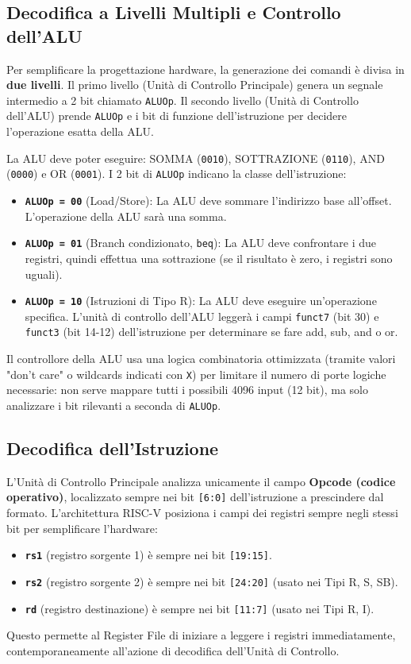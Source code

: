\documentclass[12pt, a4paper]{article}
\begin{document}
\subsection{Decodifica a Livelli Multipli e Controllo dell'ALU}
Per semplificare la progettazione hardware, la generazione dei comandi è divisa in \textbf{due livelli}. Il primo livello (Unità di Controllo Principale) genera un segnale intermedio a 2 bit chiamato \texttt{ALUOp}. Il secondo livello (Unità di Controllo dell'ALU) prende \texttt{ALUOp} e i bit di funzione dell'istruzione per decidere l'operazione esatta della ALU.

La ALU deve poter eseguire: SOMMA (\texttt{0010}), SOTTRAZIONE (\texttt{0110}), AND (\texttt{0000}) e OR (\texttt{0001}). 
I 2 bit di \texttt{ALUOp} indicano la classe dell'istruzione:
\begin{itemize}
    \item \textbf{\texttt{ALUOp = 00}} (Load/Store): La ALU deve sommare l'indirizzo base all'offset. L'operazione della ALU sarà una somma.
    \item \textbf{\texttt{ALUOp = 01}} (Branch condizionato, \texttt{beq}): La ALU deve confrontare i due registri, quindi effettua una sottrazione (se il risultato è zero, i registri sono uguali).
    \item \textbf{\texttt{ALUOp = 10}} (Istruzioni di Tipo R): La ALU deve eseguire un'operazione specifica. L'unità di controllo dell'ALU leggerà i campi \texttt{funct7} (bit 30) e \texttt{funct3} (bit 14-12) dell'istruzione per determinare se fare add, sub, and o or.
\end{itemize}

Il controllore della ALU usa una logica combinatoria ottimizzata (tramite valori "don't care" o wildcards indicati con \texttt{X}) per limitare il numero di porte logiche necessarie: non serve mappare tutti i possibili 4096 input (12 bit), ma solo analizzare i bit rilevanti a seconda di \texttt{ALUOp}.

\subsection{Decodifica dell'Istruzione}
L'Unità di Controllo Principale analizza unicamente il campo \textbf{Opcode (codice operativo)}, localizzato sempre nei bit \texttt{[6:0]} dell'istruzione a prescindere dal formato.
L'architettura RISC-V posiziona i campi dei registri sempre negli stessi bit per semplificare l'hardware:
\begin{itemize}
    \item \textbf{\texttt{rs1}} (registro sorgente 1) è sempre nei bit \texttt{[19:15]}.
    \item \textbf{\texttt{rs2}} (registro sorgente 2) è sempre nei bit \texttt{[24:20]} (usato nei Tipi R, S, SB).
    \item \textbf{\texttt{rd}} (registro destinazione) è sempre nei bit \texttt{[11:7]} (usato nei Tipi R, I).
\end{itemize}
Questo permette al Register File di iniziare a leggere i registri immediatamente, contemporaneamente all'azione di decodifica dell'Unità di Controllo.
\end{document}

